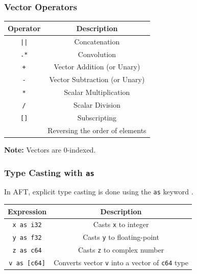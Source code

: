 \subsubsection{Vector Operators}
\begin{table}[H]
    \centering
    \begin{tabular}{cc}
        \toprule
        \textbf{Operator} & \textbf{Description} \\
        \midrule
        \texttt{||} & Concatenation \\
        \texttt{.*} & Convolution \\
        \texttt{+} & Vector Addition (or Unary) \\
        \texttt{-} & Vector Subtraction (or Unary) \\
        \texttt{*} & Scalar Multiplication \\
        \texttt{/} & Scalar Division \\
        \texttt{[]} & Subscripting \\
        \texttt{~} & Reversing the order of elements \\
        \bottomrule
    \end{tabular}
\end{table}
\textbf{Note:} Vectors are 0-indexed.

\subsubsection{Type Casting with \texttt{as}}

In AFT, explicit type casting is done using the \texttt{as} keyword .

\begin{table}[H]
    \centering
    \begin{tabular}{cc}
        \toprule
        \textbf{Expression} & \textbf{Description} \\
        \midrule
        \texttt{x as i32} & Casts \texttt{x} to integer \\
        \texttt{y as f32} & Casts \texttt{y} to floating-point \\
        \texttt{z as c64} & Casts \texttt{z} to complex number \\
        \texttt{v as [c64]} & Converts vector \texttt{v} into a vector of \texttt{c64} type \\
        \bottomrule
    \end{tabular}
\end{table}

